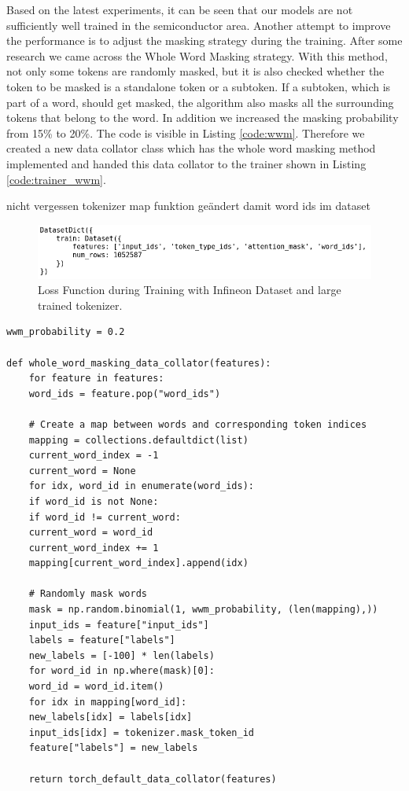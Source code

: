 Based on the latest experiments, it can be seen that our models are not sufficiently well trained in the semiconductor area. Another attempt to improve the performance is to adjust the masking strategy during the training. After some research we came across the Whole Word Masking strategy. With this method, not only some tokens are randomly masked, but it is also checked whether the token to be masked is a standalone token or a subtoken. If a subtoken, which is part of a word, should get masked, the algorithm also masks all the surrounding tokens that belong to the word. In addition we increased the masking probability from 15\% to 20\%. The code is visible in Listing \ref{code:wwm}. Therefore we created a new data collator class \alert{which has the whole word masking method implemented} and handed this data collator to the trainer shown in Listing \ref{code:trainer_wwm}.

\alert{nicht vergessen tokenizer map funktion geändert damit word ids im dataset}
\begin{figure}[H]
	\centering
	\includegraphics[width=1\textwidth]{figures/tok_dataset_wordids.png}
	\caption{Loss Function during Training with Infineon Dataset and large trained tokenizer.}
	\label{fig:data_wordids}
\end{figure}

\begin{code}
	\label{code:wwm}
\begin{verbatim}
wwm_probability = 0.2

def whole_word_masking_data_collator(features):
	for feature in features:
	word_ids = feature.pop("word_ids")
	
	# Create a map between words and corresponding token indices
	mapping = collections.defaultdict(list)
	current_word_index = -1
	current_word = None
	for idx, word_id in enumerate(word_ids):
	if word_id is not None:
	if word_id != current_word:
	current_word = word_id
	current_word_index += 1
	mapping[current_word_index].append(idx)
	
	# Randomly mask words
	mask = np.random.binomial(1, wwm_probability, (len(mapping),))
	input_ids = feature["input_ids"]
	labels = feature["labels"]
	new_labels = [-100] * len(labels)
	for word_id in np.where(mask)[0]:
	word_id = word_id.item()
	for idx in mapping[word_id]:
	new_labels[idx] = labels[idx]
	input_ids[idx] = tokenizer.mask_token_id
	feature["labels"] = new_labels
	
	return torch_default_data_collator(features)
\end{verbatim}
\end{code}

